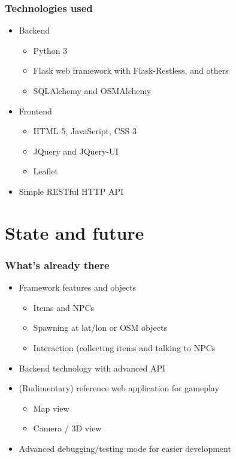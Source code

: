 \documentclass[aspectratio=43]{beamer}
\begin{document}
 \begin{frame}
  \frametitle{Technologies used}

  \begin{itemize}
   \item{Backend
    \begin{itemize}
     \item{Python 3}
     \item{Flask web framework with Flask-Restless, and others}
     \item{SQLAlchemy and OSMAlchemy}
    \end{itemize}
   }
   \item{Frontend
    \begin{itemize}
     \item{HTML 5, JavaScript, CSS 3}
     \item{JQuery and JQuery-UI}
     \item{Leaflet}
    \end{itemize}
   }
   \item{Simple RESTful HTTP API}
  \end{itemize}
 \end{frame}


 \section{State and future}

 \begin{frame}
  \frametitle{What's already there}

  \begin{itemize}
   \item{Framework features and objects
    \begin{itemize}
     \item{Items and NPCs}
     \item{Spawning at lat/lon or OSM objects}
     \item{Interaction (collecting items and talking to NPCs}
    \end{itemize}
   }
   \item{Backend technology with advanced API}
   \item{(Rudimentary) reference web application for gameplay
    \begin{itemize}
     \item{Map view}
     \item{Camera / 3D view}
    \end{itemize}
   }
   \item{Advanced debugging/testing mode for easier development}
  \end{itemize}
 \end{frame}
\end{document}
